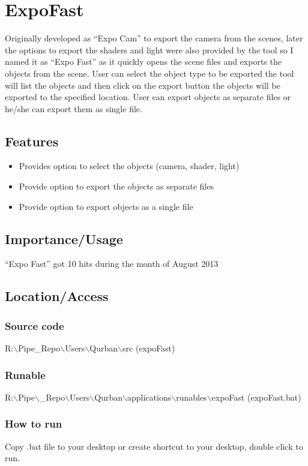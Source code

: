 \section{ExpoFast}

Originally developed as “Expo Cam” to export the camera from the scenes, later
the options to export the shaders and light were also provided by the tool so
I named it as “Expo Fast” as it quickly opens the scene files and exports the
objects from the scene. User can select the object type to be exported the
tool will list the objects and then click on the export button the objects
will be exported to the specified location. User can export objects as
separate files or he/she can export them as single file.

\subsection*{Features}
\begin{itemize}
\item Provides option to select the objects (camera, shader, light)
\item Provide option to export the objects as separate files
\item Provide option to export objects as a single file
\end{itemize}

\subsection*{Importance/Usage}

“Expo Fast” got 10 hits during the month of August 2013

\subsection*{Location/Access}

\subsubsection{Source code} 

R:$\backslash$Pipe\_Repo$\backslash$Users$\backslash$Qurban$\backslash$src (expoFast)

\subsubsection{Runable} 

R:$\backslash$Pipe$\backslash$\_Repo$\backslash$Users$\backslash$Qurban$\backslash$applications$\backslash$runables$\backslash$expoFast (expoFast.bat)

\subsubsection{How to run}

Copy .bat file to your desktop or create shortcut to your desktop, double
click to run.


